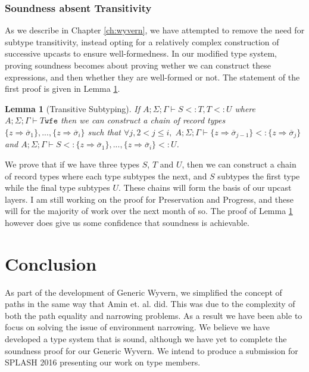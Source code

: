 \documentclass[11pt
              , a4paper
              , twoside
              , openright
              ]{report}
\newtheorem{lemma}{Lemma}
\numberwithin{case}{theorem}
\numberwithin{subcase}{case}
\begin{document}
\subsection{Soundness absent Transitivity}
As we describe in Chapter \ref{ch:wyvern}, we have attempted to remove the need for subtype transitivity, instead opting for a relatively complex construction of successive upcasts to ensure well-formedness. In our modified type system, proving soundness becomes about proving wether we can construct these expressions, and then whether they are well-formed or not. The statement of the first proof is given in Lemma \ref{lem:transitivity}.
\begin{lemma}[Transitive Subtyping] \label{lem:transitivity}
If 	$A; \Sigma; \Gamma \vdash S <: T, T <: U$ where
	$A; \Sigma; \Gamma \vdash T \texttt{wfe}$ then 
	we can construct a chain of record types 
	$\{z \Rightarrow \overline{\sigma}_1\}, ..., \{z \Rightarrow \overline{\sigma}_i\}$
	such that $\forall j, 2 < j \leq i, \; 
	A; \Sigma; \Gamma \vdash \{z \Rightarrow \overline{\sigma}_{j-1}\} <: \{z \Rightarrow \overline{\sigma}_{j}\}$
	and
	$A; \Sigma; \Gamma \vdash S <: \{z \Rightarrow \overline{\sigma}_1\}, ..., \{z \Rightarrow \overline{\sigma}_i\} <:U$.
\end{lemma}
We prove that if we have three types $S$, $T$ and $U$, then we can construct a chain of record types where each type subtypes the next, and $S$ subtypes the first type while the final type subtypes $U$. These chains will form the basis of our upcast layers. I am still working on the proof for Preservation and Progress, and these will for the majority of work over the next month of so. The proof of Lemma \ref{lem:transitivity} however does give us some confidence that soundness is achievable.




\chapter{Conclusion}\label{ch:conclusion}

As part of the development of Generic Wyvern, we simplified the concept of paths in the same way that Amin et. al. \cite{Amin:2014:FPT:2660193.2660216} did. This was due to the complexity of both the path equality and narrowing problems. As a result we have been able to focus on solving the issue of environment narrowing. We believe we have developed a type system that is sound, although we have yet to complete the soundness proof for our Generic Wyvern. We intend to produce a submission for SPLASH 2016 \cite{splash2016} presenting our work on type members. 
\end{document}
